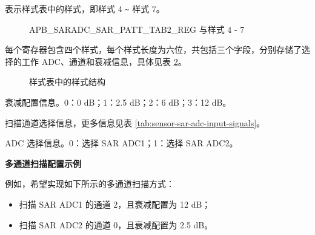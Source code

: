 \documentclass[main\_\_CN.tex]{subfiles}
\begin{document}
%
%
%
%
%
\begin{regdesc}\begin{reglist}
\item [cmd \regindex{x}] 表示样式表中的样式，即样式 4 \verb+~+ 样式 7。
\end{reglist}\end{regdesc}
\vspace{-2em}
\begin{figure}[H]
    \centering
    \caption{APB\_SARADC\_SAR\_PATT\_TAB2\_REG 与样式 4 - 7}
    \label{fig:sensor-apb-saradc-sar-patt-tab2-reg-pattern-tab-entry4-entry7}
\end{figure}

每个寄存器包含四个样式，每个样式长度为六位，共包括三个字段，分别存储了选择的工作 ADC、通道和衰减信息，具体见表 \ref{fig:sensor-pattern-table-entry}。

\begin{figure}[H]
\centering
{}%
%
%
\end{figure}
\vspace{-2em}
\begin{figure}[H]
    \centering
    \caption{样式表中的样式结构}
    \label{fig:sensor-pattern-table-entry}
\end{figure}
\vspace{-2em}
\begin{regdesc}\begin{reglist}
\item [atten] 衰减配置信息。0：0 dB；1：2.5 dB；2：6 dB；3：12 dB。
\item [ch\_sel] 扫描通道选择信息，更多信息见表 \ref{tab:sensor-sar-adc-input-signals}。
\item [sar\_sel] ADC 选择信息。0：选择 SAR ADC1；1：选择 SAR ADC2。
\end{reglist}\end{regdesc}




\textbf{多通道扫描配置示例}

例如，希望实现如下所示的多通道扫描方式：
\begin{itemize}
    \item 扫描 SAR ADC1 的通道 2，且衰减配置为 12 dB；
    \item 扫描 SAR ADC2 的通道 0，且衰减配置为 2.5 dB。
\end{itemize}
\end{document}

